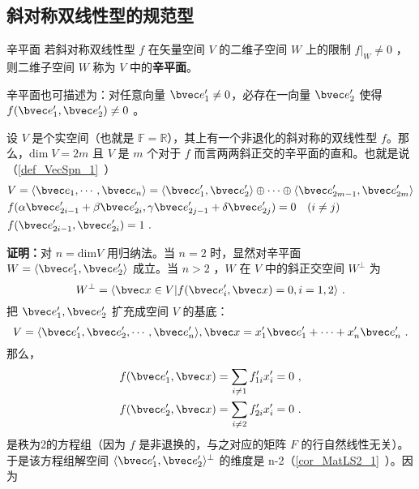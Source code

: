  \subsection{斜对称双线性型的规范型}
 \begin{definition}{辛平面}
 若斜对称双线性型 $f$ 在矢量空间 $V$ 的二维子空间 $W$ 上的限制 $f|_W\neq0$ ，则二维子空间 $W$ 称为 $V$ 中的\textbf{辛平面}。
 \end{definition}
 辛平面也可描述为：对任意向量 $\bvec e'_1\neq0$，必存在一向量 $\bvec e'_2$ 使得 $f(\bvec e'_1,\bvec e'_2)\neq0$ 。
 \begin{theorem}{}
 设 $V$ 是个实空间（也就是 $\mathbb{F}=\mathbb{R}$），其上有一个非退化的斜对称的双线性型 $f$。那么，$\mathrm{dim}\;V=2m$ 且 $V$ 是 $m$ 个对于 $f$ 而言两两斜正交的辛平面的直和。也就是说（\autoref{def_VecSpn_1}~）
 \begin{equation}
 \begin{aligned}
 &V=\langle\bvec e_1,\cdots,\bvec e_n\rangle=\langle\bvec e'_1,\bvec e'_2\rangle\oplus\cdots\oplus\langle\bvec e'_{2m-1},\bvec e'_{2m}\rangle\\
&f(\alpha\bvec e'_{2i-1}+\beta\bvec e'_{2i},\gamma\bvec e'_{2j-1}+\delta\bvec e'_{2j})=0\quad (i\neq j)~\\
 &f(\bvec e'_{2i-1},\bvec e'_{2i})=1~.
 \end{aligned}
 \end{equation}

 \end{theorem}
\textbf{证明：}对 $n=\mathrm{dim} V$ 用归纳法。当 $n=2$ 时，显然对辛平面 $W=\langle \bvec e'_1,\bvec e'_2\rangle$ 成立。当 $n>2$ ，$W$ 在 $V$ 中的斜正交空间 $W^{\perp}$ 为
\begin{equation}
W^{\perp}=\langle\bvec x\in V|f(\bvec e'_i,\bvec x)=0,i=1,2\rangle~.
\end{equation}
把 $\bvec e'_1,\bvec e'_2$ 扩充成空间 $V$ 的基底：
\begin{equation}
V=\langle \bvec e'_1,\bvec e'_2,\cdots,\bvec e'_n\rangle, \bvec x=x'_1\bvec e'_1+\cdots+x'_n\bvec e'_n~.
\end{equation}
那么，
\begin{equation}
\begin{aligned}
&f(\bvec e'_1,\bvec x)=\sum_{i\neq 1}f'_{1i}x'_i=0~,\\
&f(\bvec e'_2,\bvec x)=\sum_{i\neq 2}f'_{2i}x'_i=0~.
\end{aligned}
\end{equation}
是秩为2的方程组（因为 $f$ 是非退换的，与之对应的矩阵 $F$ 的行自然线性无关）。于是该方程组解空间 $\langle\bvec e'_1,\bvec e'_2\rangle^{\perp}$ 的维度是 n-2（\autoref{cor_MatLS2_1}~）。因为
